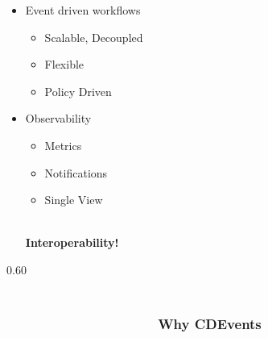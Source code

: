 \documentclass[aspectratio=169,11pt,hyperref={colorlinks=true}]{beamer}
\begin{document}
\begin{lpicrblack}[whycdevents]{}%
  {%
  \begin{itemize}
    \item Event driven workflows
    \begin{itemize}
      \item Scalable, Decoupled
      \item Flexible
      \item Policy Driven
    \end{itemize}
    \item Observability
    \begin{itemize}
      \item Metrics
      \item Notifications
      \item Single View
    \end{itemize}
    ~ \\
    \textbf{Interoperability!} \\
  \end{itemize}
  }%
  {0.60}
  \frametitle{~~~~~~~~~~~~~~~~~~~~~~~~~~~~~~~~~~~~~~~~~~~~~~~~~~~~~~~~~~~~~~~~~~~~~~~~~Why CDEvents}
\end{lpicrblack}
\end{document}
